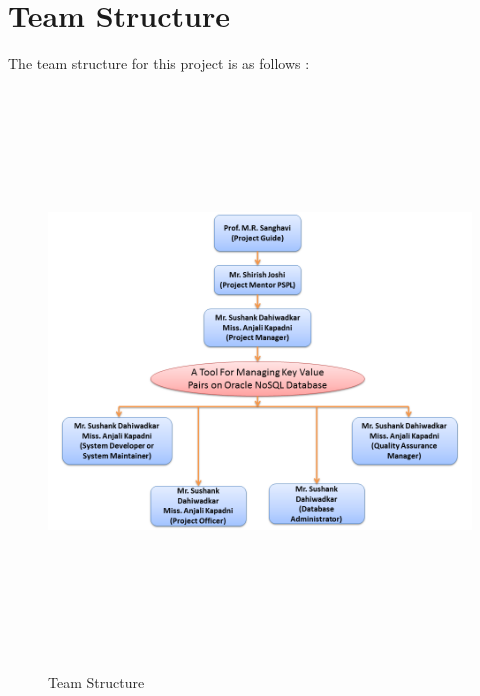 \section{Team Structure}
The team structure for this project is as follows :
\begin{figure}[h]
\centering
  \includegraphics[width=15cm,height=15cm]{TS.png}\\
  \caption{Team Structure} \label{Team Structure}
\end{figure} 